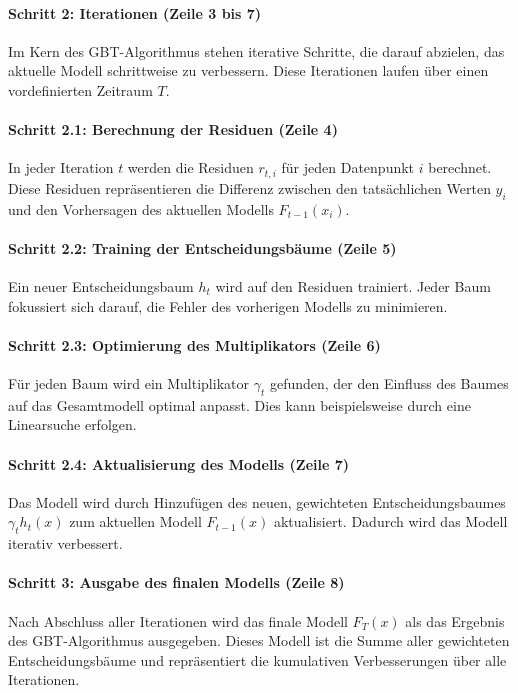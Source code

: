 \paragraph{Schritt 2: Iterationen (Zeile 3 bis 7)}
\label{para:gbt_algo_s2}
Im Kern des GBT-Algorithmus stehen iterative Schritte, die darauf abzielen, das aktuelle Modell schrittweise zu verbessern. Diese Iterationen laufen über einen vordefinierten Zeitraum \( T \).

\paragraph{Schritt 2.1: Berechnung der Residuen (Zeile 4)}
\label{para:gbt_algo_s2.1}
In jeder Iteration \( t \) werden die Residuen \( r_{t,i} \) für jeden Datenpunkt \( i \) berechnet. Diese Residuen repräsentieren die Differenz zwischen den tatsächlichen Werten \( y_i \) und den Vorhersagen des aktuellen Modells \( F_{t-1}(x_i) \).

\paragraph{Schritt 2.2: Training der Entscheidungsbäume (Zeile 5)}
\label{para:gbt_algo_s2.2}
Ein neuer Entscheidungsbaum \( h_t \) wird auf den Residuen trainiert. Jeder Baum fokussiert sich darauf, die Fehler des vorherigen Modells zu minimieren.

\paragraph{Schritt 2.3: Optimierung des Multiplikators (Zeile 6)}
\label{para:gbt_algo_s2.3}
Für jeden Baum wird ein Multiplikator \( \gamma_t \) gefunden, der den Einfluss des Baumes auf das Gesamtmodell optimal anpasst. Dies kann beispielsweise durch eine Linearsuche erfolgen.

\paragraph{Schritt 2.4: Aktualisierung des Modells (Zeile 7)}
\label{para:gbt_algo_s2.4}
Das Modell wird durch Hinzufügen des neuen, gewichteten Entscheidungsbaumes \( \gamma_t h_t(x) \) zum aktuellen Modell \( F_{t-1}(x) \) aktualisiert. Dadurch wird das Modell iterativ verbessert.

\paragraph{Schritt 3: Ausgabe des finalen Modells (Zeile 8)}
\label{para:gbt_algo_s3}
Nach Abschluss aller Iterationen wird das finale Modell \( F_T(x) \) als das Ergebnis des GBT-Algorithmus ausgegeben. Dieses Modell ist die Summe aller gewichteten Entscheidungsbäume und repräsentiert die kumulativen Verbesserungen über alle Iterationen.

